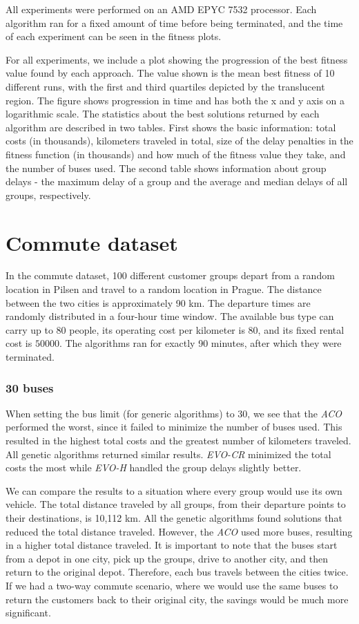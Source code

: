 All experiments were performed on an AMD EPYC 7532 processor. Each algorithm ran for a fixed amount of time before being terminated, and the time of each experiment can be seen in the fitness plots.

For all experiments, we include a plot showing the progression of the best fitness value found by each approach. The value shown is the mean best fitness of 10 different runs, with the first and third quartiles depicted by the translucent region. The figure shows progression in time and has both the x and y axis on a logarithmic scale. The statistics about the best solutions returned by each algorithm are described in two tables. First shows the basic information: total costs (in thousands), kilometers traveled in total, size of the delay penalties in the fitness function (in thousands) and how much of the fitness value they take, and the number of buses used. The second table shows information about group delays - the maximum delay of a group and the average and median delays of all groups, respectively.

\section{Commute dataset}

In the commute dataset, 100 different customer groups depart from a random location in Pilsen and travel to a random location in Prague. The distance between the two cities is approximately 90 km. The departure times are randomly distributed in a four-hour time window. The available bus type can carry up to $80$ people, its operating cost per kilometer is $80$, and its fixed rental cost is $50000$. The algorithms ran for exactly 90 minutes, after which they were terminated.

\subsubsection{30 buses}

When setting the bus limit (for generic algorithms) to 30, we see that the \textit{ACO} performed the worst, since it failed to minimize the number of buses used. This resulted in the highest total costs and the greatest number of kilometers traveled. All genetic algorithms returned similar results. \textit{EVO-CR} minimized the total costs the most while \textit{EVO-H} handled the group delays slightly better.

We can compare the results to a situation where every group would use its own vehicle. The total distance traveled by all groups, from their departure points to their destinations, is 10,112 km. All the genetic algorithms found solutions that reduced the total distance traveled. However, the \textit{ACO} used more buses, resulting in a higher total distance traveled. It is important to note that the buses start from a depot in one city, pick up the groups, drive to another city, and then return to the original depot. Therefore, each bus travels between the cities twice. If we had a two-way commute scenario, where we would use the same buses to return the customers back to their original city, the savings would be much more significant.

